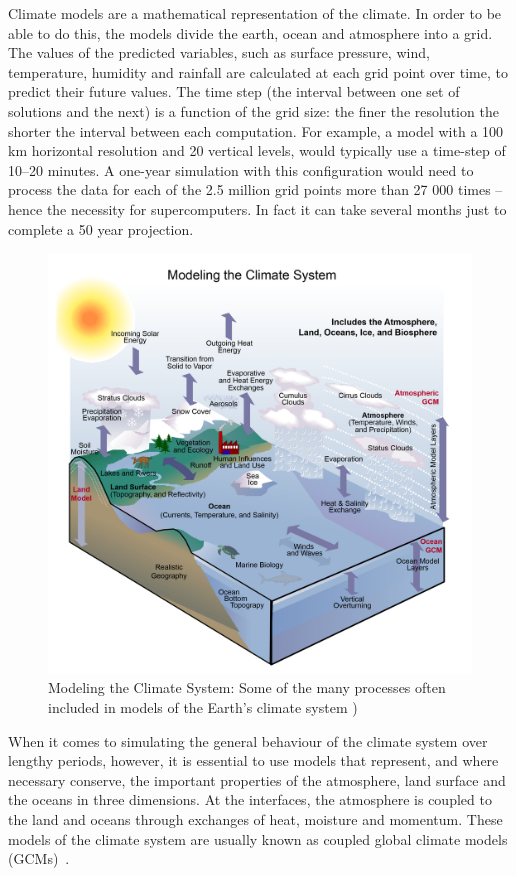 Climate models are a mathematical representation of the climate. In order to be able to do this, the models divide 
the earth, ocean and atmosphere into a grid. The values of the predicted variables, such as surface pressure, wind, 
temperature, humidity and rainfall are calculated at each grid point over time, to predict their future values. 
The time step (the interval between one set of solutions and the next) is a function of the grid size: the finer the 
resolution the shorter the interval between each computation. For example, a model with a 100 km horizontal resolution 
and 20 vertical levels, would typically use a time-step of 10--20 minutes. A one-year simulation with this configuration 
would need to process the data for each of the 2.5 million grid points more than 27 000 times -- hence the necessity 
for supercomputers. In fact it can take several months just to complete a 50 year projection. 


\begin{figure}[!hp]
    \centering
    \includegraphics[scale=0.6]{pic/APP_modeling_the_climate_V2}
    \caption{Modeling the Climate System: Some of the many processes often included in models of the Earth's climate system \cite{KT2003})}
    \label{fig:schema2}
\end{figure}


When it comes to simulating the general behaviour of the climate system over lengthy periods, however, 
it is essential to use models that represent, and where necessary conserve, the important properties of the 
atmosphere, land surface and the oceans in three dimensions. At the interfaces, the atmosphere is coupled to the land 
and oceans through exchanges of heat, moisture and momentum. These models of the climate system are usually known as coupled global climate models (GCMs)~\cite{wmo-models}.

